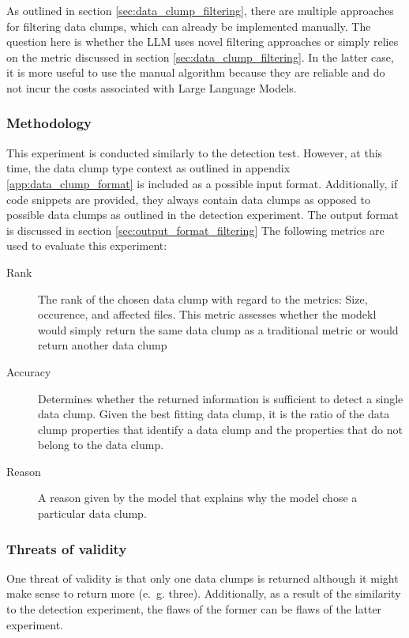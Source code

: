As outlined in section \ref{sec:data_clump_filtering}, there are multiple approaches for filtering data clumps, which can already be implemented manually. 
The question here is whether the \ac{LLM} uses novel filtering approaches or simply relies on the metric discussed in section \ref{sec:data_clump_filtering}. In the latter case, it is more useful to use the manual algorithm because they are reliable and do not incur the costs associated with Large Language Models. 

\subsubsection{Methodology}

This experiment is conducted similarly to the detection test. However, at this time, the data clump type context as outlined in appendix \ref{app:data_clump_format} is included as a possible input format. Additionally, if code snippets are provided, they always contain data clumps as opposed to possible data clumps as outlined in the detection experiment. 
The output format is discussed in section \ref{sec:output_format_filtering}
The following metrics are used to evaluate this experiment:
\begin{description}
    
    \item [Rank] The rank of the chosen data clump with regard to the metrics: Size, occurence, and affected files. This metric assesses whether the modekl would simply return the same data clump as a traditional metric or would return another data clump 
    \item [Accuracy] Determines  whether the returned information is sufficient to detect a single data clump. Given the best fitting data clump,  it is the ratio of the data clump properties that identify a data clump and the properties that do not belong to the data clump. 
    \item [Reason] A reason given by the model that explains why the model chose a particular data clump. 
\end{description}

\subsubsection{Threats of validity}

One threat of validity is   that only one data clumps is returned although it might make sense to return more (e.~g. three). Additionally, as a result of the similarity to the detection experiment, the flaws of the former can be flaws of the latter experiment. 
